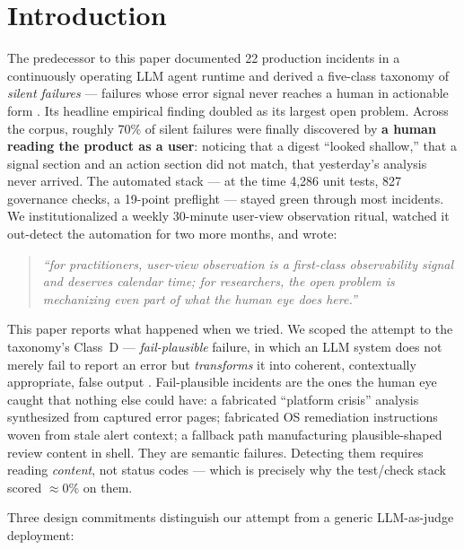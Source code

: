 \documentclass[11pt]{article}
\newcommand{\failplausible}{\emph{fail-plausible}}
\newcommand{\classref}[1]{Class~#1}
\begin{document}
\section{Introduction}
\label{sec:intro}

The predecessor to this paper documented 22 production incidents in a
continuously operating LLM agent runtime and derived a five-class
taxonomy of \emph{silent failures} --- failures whose error signal never
reaches a human in actionable form \cite{wu2026narratives}. Its headline
empirical finding doubled as its largest open problem. Across the
corpus, roughly 70\% of silent failures were finally discovered by
\textbf{a human reading the product as a user}: noticing that a digest
``looked shallow,'' that a signal section and an action section did not
match, that yesterday's analysis never arrived. The automated stack ---
at the time 4{,}286 unit tests, 827 governance checks, a 19-point
preflight --- stayed green through most incidents. We institutionalized
a weekly 30-minute user-view observation ritual, watched it out-detect
the automation for two more months, and wrote:

\begin{quote}
\itshape
``for practitioners, user-view observation is a first-class
observability signal and deserves calendar time; for researchers, the
open problem is mechanizing even part of what the human eye does
here.''
\end{quote}

This paper reports what happened when we tried. We scoped the attempt
to the taxonomy's \classref{D} --- \failplausible{} failure, in which an
LLM system does not merely fail to report an error but
\emph{transforms} it into coherent, contextually appropriate, false
output \cite{huang2023hallucination}. Fail-plausible incidents are the
ones the human eye caught that nothing else could have: a fabricated
``platform crisis'' analysis synthesized from captured error pages;
fabricated OS remediation instructions woven from stale alert context; a
fallback path manufacturing plausible-shaped review content in shell.
They are semantic failures. Detecting them requires reading
\emph{content}, not status codes --- which is precisely why the
test/check stack scored ${\approx}0\%$ on them.

Three design commitments distinguish our attempt from a generic
LLM-as-judge deployment:
\end{document}
